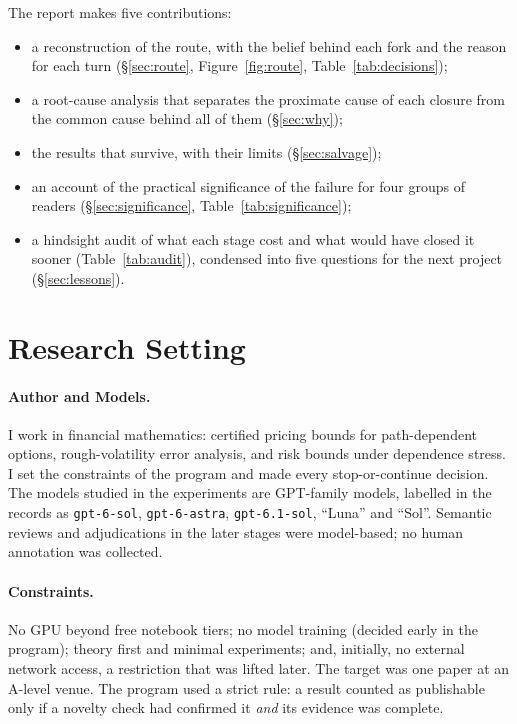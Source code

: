 \documentclass[11pt]{article}
\begin{document}
The report makes five contributions:
\begin{itemize}
\item a reconstruction of the route, with the belief behind each fork and the reason for each turn (\S\ref{sec:route}, Figure~\ref{fig:route}, Table~\ref{tab:decisions});
\item a root-cause analysis that separates the proximate cause of each closure from the common cause behind all of them (\S\ref{sec:why});
\item the results that survive, with their limits (\S\ref{sec:salvage});
\item an account of the practical significance of the failure for four groups of readers (\S\ref{sec:significance}, Table~\ref{tab:significance});
\item a hindsight audit of what each stage cost and what would have closed it sooner (Table~\ref{tab:audit}), condensed into five questions for the next project (\S\ref{sec:lessons}).
\end{itemize}

\section{Research Setting}
\label{sec:setting}

\paragraph{Author and Models.} I work in financial mathematics: certified pricing bounds for path-dependent options, rough-volatility error analysis, and risk bounds under dependence stress. I set the constraints of the program and made every stop-or-continue decision. The models studied in the experiments are GPT-family models, labelled in the records as \texttt{gpt-6-sol}, \texttt{gpt-6-astra}, \texttt{gpt-6.1-sol}, ``Luna'' and ``Sol''. Semantic reviews and adjudications in the later stages were model-based; no human annotation was collected.

\paragraph{Constraints.} No GPU beyond free notebook tiers; no model training (decided early in the program); theory first and minimal experiments; and, initially, no external network access, a restriction that was lifted later. The target was one paper at an A-level venue. The program used a strict rule: a result counted as publishable only if a novelty check had confirmed it \emph{and} its evidence was complete.
\end{document}
